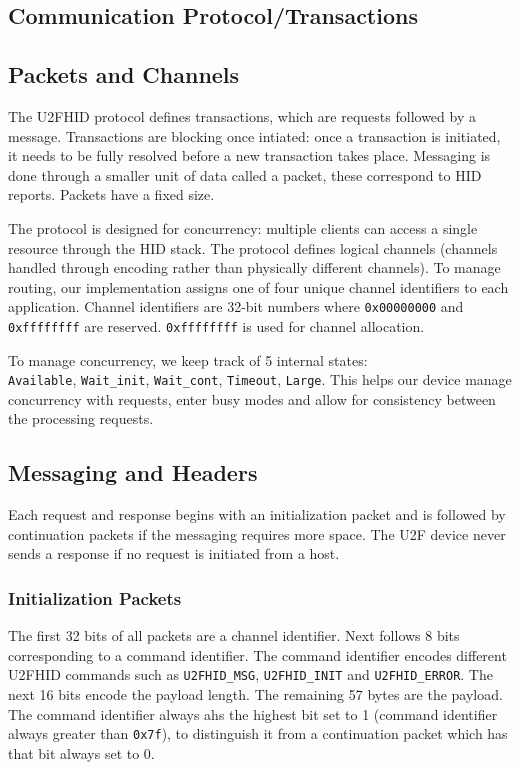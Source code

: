 \documentclass[acmtog,review]{acmart}
\begin{document}
\subsection{Communication Protocol/Transactions}

\subsection{Packets and Channels}

The U2FHID protocol defines transactions, which are requests followed by a message.
Transactions are blocking once intiated: once a transaction is initiated, it needs 
to be fully resolved before a new transaction takes place. Messaging is done through
a smaller unit of data called a packet, these correspond to HID reports. Packets have
a fixed size.

The protocol is designed for concurrency: multiple clients can access a single resource
through the HID stack. The protocol defines logical channels (channels handled through
encoding rather than physically different channels). To manage routing, our implementation
assigns one of four unique channel identifiers to each application. Channel identifiers
are 32-bit numbers where \texttt{0x00000000} and \texttt{0xffffffff} are reserved. 
\texttt{0xffffffff} is used for channel allocation.

To manage concurrency, we keep track of 5 internal states: \\\texttt{Available}, 
\texttt{Wait\_init}, \texttt{Wait\_cont}, \texttt{Timeout}, \texttt{Large}. This helps
our device manage concurrency with requests, enter busy modes and allow for consistency
between the processing requests.

\subsection{Messaging and Headers}

Each request and response begins with an initialization packet and is followed by 
continuation packets if the messaging requires more space. The U2F device never sends
a response if no request is initiated from a host.

\subsubsection{Initialization Packets}

The first 32 bits of all packets are a channel identifier. Next follows 8 bits
corresponding to a command identifier. The command identifier encodes different U2FHID 
commands such as \texttt{U2FHID\_MSG}, \texttt{U2FHID\_INIT} and \texttt{U2FHID\_ERROR}. 
The next 16 bits encode the payload length. The remaining
57 bytes are the payload. The command identifier always ahs the highest bit set to
1 (command identifier always greater than \texttt{0x7f}), to distinguish it from
a continuation packet which has that bit always set to 0.
\end{document}
